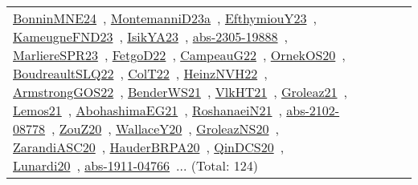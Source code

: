 {\begin{longtable}{lp{3cm}>{\raggedright\arraybackslash}p{6cm}>{\raggedright\arraybackslash}p{6cm}>{\raggedright\arraybackslash}p{8cm}}
\href{../works/BonninMNE24.pdf}{BonninMNE24}~\cite{BonninMNE24}, \href{../works/MontemanniD23a.pdf}{MontemanniD23a}~\cite{MontemanniD23a}, \href{../works/EfthymiouY23.pdf}{EfthymiouY23}~\cite{EfthymiouY23}, \href{../works/KameugneFND23.pdf}{KameugneFND23}~\cite{KameugneFND23}, \href{../works/IsikYA23.pdf}{IsikYA23}~\cite{IsikYA23}, \href{../works/abs-2305-19888.pdf}{abs-2305-19888}~\cite{abs-2305-19888}, \href{../works/MarliereSPR23.pdf}{MarliereSPR23}~\cite{MarliereSPR23}, \href{../works/FetgoD22.pdf}{FetgoD22}~\cite{FetgoD22}, \href{../works/CampeauG22.pdf}{CampeauG22}~\cite{CampeauG22}, \href{../works/OrnekOS20.pdf}{OrnekOS20}~\cite{OrnekOS20}, \href{../works/BoudreaultSLQ22.pdf}{BoudreaultSLQ22}~\cite{BoudreaultSLQ22}, \href{../works/ColT22.pdf}{ColT22}~\cite{ColT22}, \href{../works/HeinzNVH22.pdf}{HeinzNVH22}~\cite{HeinzNVH22}, \href{../works/ArmstrongGOS22.pdf}{ArmstrongGOS22}~\cite{ArmstrongGOS22}, \href{../works/BenderWS21.pdf}{BenderWS21}~\cite{BenderWS21}, \href{../works/VlkHT21.pdf}{VlkHT21}~\cite{VlkHT21}, \href{../works/Groleaz21.pdf}{Groleaz21}~\cite{Groleaz21}, \href{../works/Lemos21.pdf}{Lemos21}~\cite{Lemos21}, \href{../works/AbohashimaEG21.pdf}{AbohashimaEG21}~\cite{AbohashimaEG21}, \href{../works/RoshanaeiN21.pdf}{RoshanaeiN21}~\cite{RoshanaeiN21}, \href{../works/abs-2102-08778.pdf}{abs-2102-08778}~\cite{abs-2102-08778}, \href{../works/ZouZ20.pdf}{ZouZ20}~\cite{ZouZ20}, \href{../works/WallaceY20.pdf}{WallaceY20}~\cite{WallaceY20}, \href{../works/GroleazNS20.pdf}{GroleazNS20}~\cite{GroleazNS20}, \href{../works/ZarandiASC20.pdf}{ZarandiASC20}~\cite{ZarandiASC20}, \href{../works/HauderBRPA20.pdf}{HauderBRPA20}~\cite{HauderBRPA20}, \href{../works/QinDCS20.pdf}{QinDCS20}~\cite{QinDCS20}, \href{../works/Lunardi20.pdf}{Lunardi20}~\cite{Lunardi20}, \href{../works/abs-1911-04766.pdf}{abs-1911-04766}~\cite{abs-1911-04766}... (Total: 124)\\

\end{longtable}}
